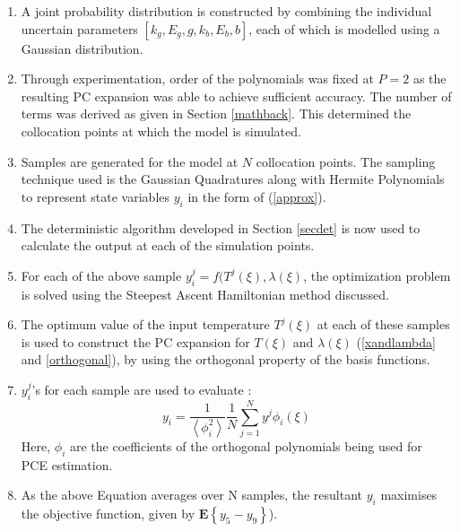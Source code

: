 \documentclass[3p,times,authoryear]{elsarticle}
\begin{document}
\begin{enumerate}

\item A joint probability distribution is constructed by combining the individual uncertain parameters $[k_{g}, E_{g}, g, k_{b}, E_{b}, b]$, each of which is modelled using a Gaussian distribution.
\item Through experimentation, order of the polynomials was fixed at $P = 2$ as the resulting PC expansion was able to achieve sufficient accuracy. The number of terms was derived as given in Section \ref{mathback}. This determined the collocation points at which the model is simulated. %
\item Samples are generated for the model at $N$ collocation points. The sampling technique used is the Gaussian Quadratures along with Hermite Polynomials to represent state variables $y_{i}$ in the form of (\ref{approx}). 

\item The deterministic algorithm developed in Section \ref{secdet} is now used to calculate the output at each of the simulation points. 

\item For each of the above sample $y^{j}_{i} = f(T^{j}(\xi),\lambda(\xi)$, the optimization problem is solved using the Steepest Ascent Hamiltonian method discussed.

\item The optimum value of the input temperature $T^{j}(\xi)$ at each of these samples is used to construct the PC expansion for $T(\xi)$ and $\lambda(\xi)$ (\ref{xandlambda} and \ref{orthogonal}), by using the orthogonal property of the basis functions. 
 

\item $y^{j}_{i}$'s for each sample are used to evaluate :
\begin{equation}
y_{i} = \frac{1}{\left\langle \phi^{2}_{i}\right\rangle }\frac{1}{N} \sum_{j=1}^{N} y^{j}\phi_{i}(\xi)
\end{equation}
Here, $\phi_{i}$ are the coefficients of the orthogonal polynomials being used for PCE estimation.  

\item As the above Equation averages over N samples, the resultant $y_{i}$ maximises the objective function, given by $ \mathbf{E} \left\lbrace  y_{5}-y_{9} \right\rbrace $). 

\end{enumerate} 
\end{document}
